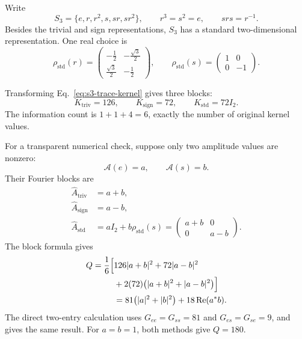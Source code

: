 \documentclass[11pt,a4paper]{article}
\newcommand{\cA}{\mathcal{A}}
\begin{document}
Write
\begin{equation}
  S_3=\{e,r,r^2,s,sr,sr^2\},
  \qquad r^3=s^2=e,
  \qquad srs=r^{-1}.
\end{equation}
Besides the trivial and sign representations, $S_3$ has a standard
two-dimensional representation.  One real choice is
\begin{equation}
  \rho_{\mathrm{std}}(r)=
  \begin{pmatrix}
    -\tfrac12&-\tfrac{\sqrt3}{2}\\
     \tfrac{\sqrt3}{2}&-\tfrac12
  \end{pmatrix},
  \qquad
  \rho_{\mathrm{std}}(s)=
  \begin{pmatrix}1&0\\0&-1\end{pmatrix}.
\end{equation}

Transforming Eq.~\eqref{eq:s3-trace-kernel} gives three blocks:
\begin{equation}
  K_{\mathrm{triv}}=126,
  \qquad
  K_{\mathrm{sign}}=72,
  \qquad
  K_{\mathrm{std}}=72I_2.
  \label{eq:s3-kernel-blocks}
\end{equation}
The information count is $1+1+4=6$, exactly the number of original kernel
values.

For a transparent numerical check, suppose only two amplitude values are
nonzero:
\begin{equation}
  \cA(e)=a,
  \qquad
  \cA(s)=b.
\end{equation}
Their Fourier blocks are
\begin{align}
  \widehat A_{\mathrm{triv}}&=a+b,\\
  \widehat A_{\mathrm{sign}}&=a-b,\\
  \widehat A_{\mathrm{std}}
    &=aI_2+b\rho_{\mathrm{std}}(s)
      =\begin{pmatrix}a+b&0\\0&a-b\end{pmatrix}.
\end{align}
The block formula gives
\begin{align}
  Q=\frac{1}{6}\Bigl[&126|a+b|^2+72|a-b|^2 \\
      &+2(72)\bigl(|a+b|^2+|a-b|^2\bigr)\Bigr] \\
   &=81\bigl(|a|^2+|b|^2\bigr)
     +18\operatorname{Re}(a^*b).
  \label{eq:s3-block-answer}
\end{align}
The direct two-entry calculation uses $G_{ee}=G_{ss}=81$ and
$G_{es}=G_{se}=9$, and gives the same result.  For $a=b=1$, both methods
give $Q=180$.
\end{document}
